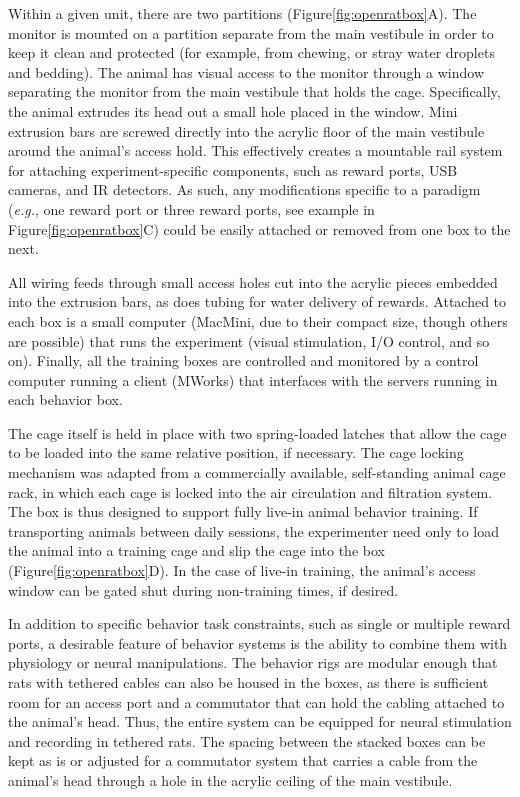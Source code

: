 Within a given unit, there are two partitions (Figure\ref{fig:openratbox}A). The monitor is mounted on a partition separate from the main vestibule in order to keep it clean and protected (for example, from chewing, or stray water droplets and bedding). The animal has visual access to the monitor through a window separating the monitor from the main vestibule that holds the cage. Specifically, the animal extrudes its head out a small hole placed in the window. Mini extrusion bars are screwed directly into the acrylic floor of the main vestibule around the animal's access hold. This effectively creates a mountable rail system for attaching experiment-specific components, such as reward ports, USB cameras, and IR detectors. As such, any modifications specific to a paradigm (\textit{e.g.}, one reward port or three reward ports, see example in Figure\ref{fig:openratbox}C) could be easily attached or removed from one box to the next. 

All wiring feeds through small access holes cut into the acrylic pieces embedded into the extrusion bars, as does tubing for water delivery of rewards. Attached to each box is a small computer (MacMini, due to their compact size, though others are possible) that runs the experiment (visual stimulation, I/O control, and so on). Finally, all the training boxes are controlled and monitored by a control computer running a client (MWorks) that interfaces with the servers running in each behavior box. 
 
The cage itself is held in place with two spring-loaded latches that allow the cage to be loaded into the same relative position, if necessary. The cage locking mechanism was adapted from a commercially available, self-standing animal cage rack, in which each cage is locked into the air circulation and filtration system. The box is thus designed to support fully live-in animal behavior training. If transporting animals between daily sessions, the experimenter need only to load the animal into a training cage and slip the cage into the box (Figure\ref{fig:openratbox}D). In the case of live-in training, the animal's access window can be gated shut during non-training times, if desired.

In addition to specific behavior task constraints, such as single or multiple reward ports, a desirable feature of behavior systems is the ability to combine them with physiology or neural manipulations. The behavior rigs are modular enough that rats with tethered cables can also be housed in the boxes, as there is sufficient room for an access port and a commutator that can hold the cabling attached to the animal's head. Thus, the entire system can be equipped for neural stimulation and recording in tethered rats. The spacing between the stacked boxes can be kept as is or adjusted for a commutator system that carries a cable from the animal's head through a hole in the acrylic ceiling of the main vestibule. 

